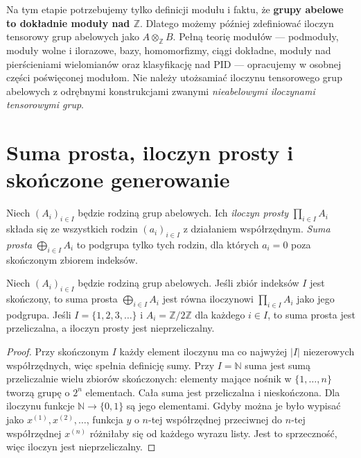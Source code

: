\begin{uwaga}
\label{aa:uw:module-roadmap}
Na tym etapie potrzebujemy tylko definicji modułu i faktu,
że \textbf{grupy abelowe to dokładnie moduły nad $\mathbb Z$}.
Dlatego możemy później zdefiniować iloczyn tensorowy grup
abelowych jako $A\otimes_{\mathbb Z}B$. Pełną teorię
modułów --- podmoduły, moduły wolne i ilorazowe, bazy,
homomorfizmy, ciągi dokładne, moduły nad pierścieniami
wielomianów oraz klasyfikację nad PID --- opracujemy
w osobnej części poświęconej modułom.
Nie należy utożsamiać iloczynu tensorowego grup abelowych
z odrębnymi konstrukcjami zwanymi \emph{nieabelowymi
iloczynami tensorowymi grup}.
\end{uwaga}

\section{Suma prosta, iloczyn prosty i skończone generowanie}
\begin{definicja}
\label{aa:def:abelian-directsum}
Niech $(A_i)_{i\in I}$ będzie rodziną grup abelowych.
Ich \emph{iloczyn prosty} $\prod_{i\in I}A_i$ składa się
ze wszystkich rodzin $(a_i)_{i\in I}$ z działaniem współrzędnym.
\emph{Suma prosta} $\bigoplus_{i\in I}A_i$ to podgrupa
tylko tych rodzin, dla których $a_i=0$ poza skończonym
zbiorem indeksów.
\end{definicja}
\begin{lemat}
\label{aa:lem:abelian-sum-product}
Niech $(A_i)_{i\in I}$ będzie rodziną grup abelowych.
Jeśli zbiór indeksów $I$ jest skończony, to suma prosta
$\bigoplus_{i\in I}A_i$ jest równa iloczynowi
$\prod_{i\in I}A_i$ jako jego podgrupa.
Jeśli $I=\{1,2,3,\ldots\}$ i $A_i=\mathbb Z/2\mathbb Z$
dla każdego $i\in I$, to suma prosta jest przeliczalna,
a iloczyn prosty jest nieprzeliczalny.
\end{lemat}
\begin{proof}
Przy skończonym $I$ każdy element iloczynu ma co najwyżej
$|I|$ niezerowych współrzędnych, więc spełnia definicję sumy.
Przy $I=\mathbb N$ suma jest sumą przeliczalnie wielu
zbiorów skończonych: elementy mające nośnik w
$\{1,\ldots,n\}$ tworzą grupę o $2^n$ elementach.
Cała suma jest przeliczalna i nieskończona.
Dla iloczynu funkcje $\mathbb N\to\{0,1\}$ są jego elementami.
Gdyby można je było wypisać jako $x^{(1)},x^{(2)},\ldots$,
funkcja $y$ o $n$-tej współrzędnej przeciwnej do
$n$-tej współrzędnej $x^{(n)}$ różniłaby się od każdego
wyrazu listy. Jest to sprzeczność, więc iloczyn jest
nieprzeliczalny.
\end{proof}

